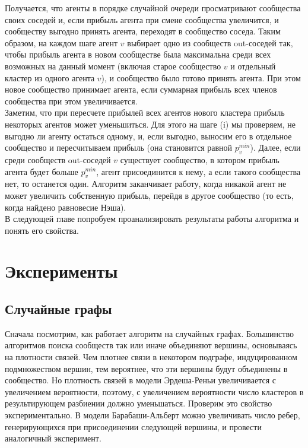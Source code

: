 Получается, что агенты в порядке случайной очереди просматривают сообщества своих соседей и, если прибыль агента при смене сообщества увеличится, и сообществу выгодно принять агента, переходят в сообщество соседа. Таким образом, на каждом шаге агент $v$ выбирает одно из сообществ out-соседей так, чтобы прибыль агента в новом сообществе была максимальна среди всех возможных на данный момент (включая старое сообщество $v$ и отдельный кластер из одного агента $v$), и сообщество было готово принять агента. При этом новое сообщество принимает агента, если суммарная прибыль всех членов сообщества при этом увеличивается.\\

Заметим, что при пересчете прибылей всех агентов нового кластера прибыль некоторых агентов может уменьшиться. Для этого на шаге (i) мы проверяем, не выгодно ли агенту остаться одному, и, если выгодно, выносим его в отдельное сообщество и пересчитываем прибыль (она становится равной $p_v^{min}$). Далее, если среди сообществ out-соседей $v$ существует сообщество, в котором прибыль агента будет больше $p_v^{min}$, агент присоединится к нему, а если такого сообщества нет, то останется один. Алгоритм заканчивает работу, когда никакой агент не может увеличить собственную прибыль, перейдя в другое сообщество (то есть, когда найдено равновесие Нэша).\\

В следующей главе попробуем проанализировать результаты работы алгоритма и понять его свойства.

\chapter{Эксперименты}
\section{Случайные графы}
Сначала посмотрим, как работает алгоритм на случайных графах. Большинство алгоритмов поиска сообществ так или иначе объединяют вершины, основываясь на плотности связей. Чем плотнее связи в некотором подграфе, индуцированном подмножеством вершин, тем вероятнее, что эти вершины будут объединены в сообщество. Но плотность связей в модели Эрдеша-Реньи увеличивается с увеличением вероятности, поэтому, с увеличением вероятности число кластеров в  результирующем разбиении должно уменьшаться. Проверим это свойство экспериментально. В модели Барабаши-Альберт можно увеличивать число ребер, генерирующихся при присоединении следующей вершины, и провести аналогичный эксперимент.

